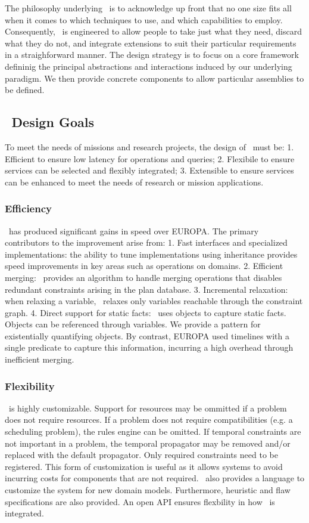 \documentclass[10pt, letterpaper, twoside]{article}
\begin{document}
The philosophy underlying \ET\, is to acknowledge up front that no
one size fits all when it comes to which techniques to use, and which
capabilities to employ. Consequently, \ET\, is engineered to allow
people to take just what they need, discard what they do not, and
integrate extensions to suit their particular requirements in a
straighforward manner. The design strategy is to focus on a core
framework defininig the principal abstractions and interactions
induced by our underlying paradigm. We then provide concrete
components to allow particular assemblies to be defined. 

\subsection{\ET\, Design Goals}
\label{goals}
To meet the needs of missions and research projects, the design of 
\ET\, must be: 1. Efficient to ensure low latency for operations and
queries; 2. Flexibile to ensure services can be selected and flexibly
integrated; 3. Extensible to ensure services can be enhanced to meet the
needs of research or mission applications. 

\subsubsection{Efficiency} \ET\, has produced significant gains in speed over
EUROPA. The primary contributors to the improvement arise from: 1. Fast
interfaces and specialized implementations: the ability to tune
implementations using inheritance provides speed improvements in key areas
such as operations on domains.  2. Efficient merging: \ET\, provides an
algorithm to handle merging operations that disables redundant constraints
arising in the plan database. 3. Incremental relaxation: when relaxing a
variable, \ET\, relaxes only variables reachable through the constraint graph.
4. Direct support for static facts: \ET\, uses objects to capture static
facts. Objects can be referenced through variables.  We provide a pattern
for existentially quantifying objects. By contrast, EUROPA used
timelines with a single predicate to capture this information, incurring a
high overhead through inefficient merging. 

\subsubsection{Flexibility} \ET\, is highly customizable. Support for
resources may be ommitted if a problem does not require resources. If a 
problem does not require compatibilities (e.g. a scheduling problem), the
rules engine can be omitted. If temporal constraints are not important in a
problem, the temporal propagator may be removed and/or replaced with the
default propagator. Only required constraints need to be registered. This
form of customization is useful as it allows systems to avoid incurring
costs for components that are not required. \ET\, also provides a language to
customize the system for new domain models.  Furthermore, heuristic and flaw
specifications are also provided. An open API ensures flexbility in how \ET\,
is integrated.
\end{document}
